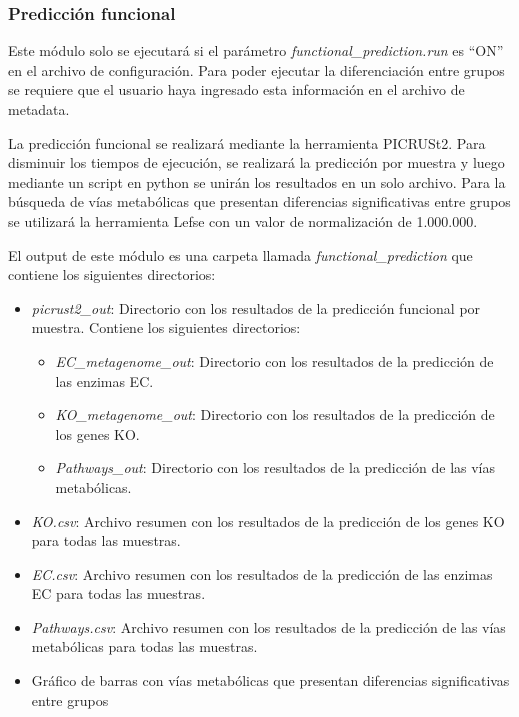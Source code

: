 \subsubsection{Predicción funcional}
Este módulo solo se ejecutará si el parámetro \textit{functional\_prediction.run} es ``ON'' en el archivo de configuración. 
Para poder ejecutar la diferenciación entre grupos se requiere que el usuario haya ingresado esta información en el archivo de metadata.

La predicción funcional se realizará mediante la herramienta PICRUSt2. 
Para disminuir los tiempos de ejecución, se realizará la predicción por muestra y luego mediante un script en python se unirán los resultados en un solo archivo.
Para la búsqueda de vías metabólicas que presentan diferencias significativas entre grupos se utilizará la herramienta Lefse con un valor de normalización de 1.000.000.

El output de este módulo es una carpeta llamada \textit{functional\_prediction} que contiene los siguientes directorios:
\begin{itemize}
    \item \textit{picrust2\_out}: Directorio con los resultados de la predicción funcional por muestra. Contiene los siguientes directorios:
    \begin{itemize}
        \item \textit{EC\_metagenome\_out}: Directorio con los resultados de la predicción de las enzimas EC.
        \item \textit{KO\_metagenome\_out}: Directorio con los resultados de la predicción de los genes KO.
        \item \textit{Pathways\_out}: Directorio con los resultados de la predicción de las vías metabólicas.
    \end{itemize}
    \item \textit{KO.csv}: Archivo resumen con los resultados de la predicción de los genes KO para todas las muestras.
    \item \textit{EC.csv}: Archivo resumen con los resultados de la predicción de las enzimas EC para todas las muestras.
    \item \textit{Pathways.csv}: Archivo resumen con los resultados de la predicción de las vías metabólicas para todas las muestras.
    \item Gráfico de barras con vías metabólicas que presentan diferencias significativas entre grupos
    \end{itemize}

